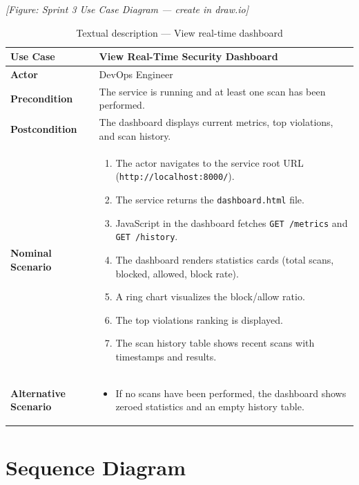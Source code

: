 \textit{[Figure: Sprint 3 Use Case Diagram — create in draw.io]}

\vspace{0.3cm}

\begin{table}[H]
\centering
\caption{Textual description — View real-time dashboard}
\label{tab:sprint3-usecase-text}
\begin{tabular}{|p{3.5cm}|p{9.5cm}|}
\hline
\textbf{Use Case} & View Real-Time Security Dashboard \\
\hline
\textbf{Actor} & DevOps Engineer \\
\hline
\textbf{Precondition} & The service is running and at least one scan has been performed. \\
\hline
\textbf{Postcondition} & The dashboard displays current metrics, top violations, and scan history. \\
\hline
\textbf{Nominal Scenario} &
\begin{enumerate}[nosep]
    \item The actor navigates to the service root URL (\texttt{http://localhost:8000/}).
    \item The service returns the \texttt{dashboard.html} file.
    \item JavaScript in the dashboard fetches \texttt{GET /metrics} and \texttt{GET /history}.
    \item The dashboard renders statistics cards (total scans, blocked, allowed, block rate).
    \item A ring chart visualizes the block/allow ratio.
    \item The top violations ranking is displayed.
    \item The scan history table shows recent scans with timestamps and results.
\end{enumerate} \\
\hline
\textbf{Alternative Scenario} &
\begin{itemize}[nosep]
    \item If no scans have been performed, the dashboard shows zeroed statistics and an empty history table.
\end{itemize} \\
\hline
\end{tabular}
\end{table}

\section{Sequence Diagram}

